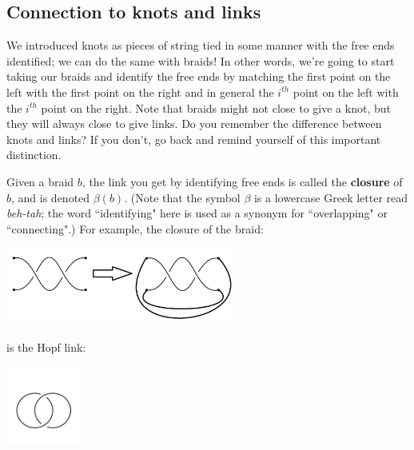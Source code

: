 \documentclass[12 pt]{article}
\begin{document}
\subsection{Connection to knots and links}
We introduced knots as pieces of string tied in some manner with the free ends identified; we can do the same with braids! In other words, we're going to start taking our braids and identify the free ends by matching the first point on the left with the first point on the right and in general the $i^{th}$ point on the left with the $i^{th}$ point on the right. Note that braids might not close to give a knot, but they will always close to give links. Do you remember the difference between knots and links? If you don't, go back and remind yourself of this important distinction.

Given a braid $b$, the link you get by identifying free ends is called the \textbf{closure} of $b$, and is denoted $\beta(b)$. (Note that the symbol $\beta$ is a lowercase Greek letter read {\it beh-tah}; the word ``identifying" here is used as a synonym for ``overlapping" or ``connecting".)
For example, the closure of the braid:
\begin{center}
\includegraphics[height = 1in]{braid_closure_ex.jpg}\\
\end{center}
is the Hopf link:
\begin{center}
\includegraphics[height = 1in]{hopf_link.jpg}
\end{center}
\end{document}
